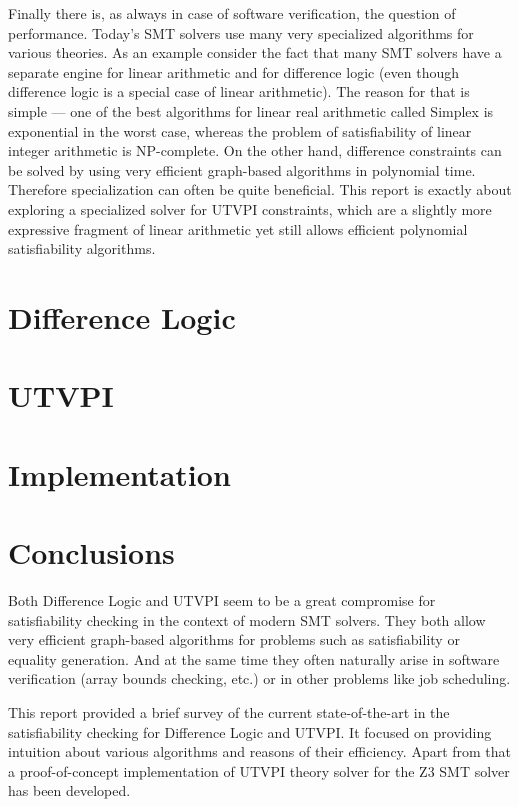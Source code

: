 \documentclass[a4paper,10pt]{article}
\begin{document}
Finally there is, as always in case of software verification, the question of
performance. Today's SMT solvers use many very specialized algorithms for
various theories. As an example consider the fact that many SMT solvers have a
separate engine for linear arithmetic and for difference logic (even though
difference logic is a special case of linear arithmetic). The reason for that is
simple --- one of the best algorithms for linear real arithmetic called Simplex
is exponential in the worst case, whereas the problem of satisfiability of
linear integer arithmetic is NP-complete. On the other hand, difference
constraints can be solved by using very efficient graph-based algorithms in
polynomial time. Therefore specialization can often be quite beneficial. This
report is exactly about exploring a specialized solver for UTVPI constraints,
which are a slightly more expressive fragment of linear arithmetic yet still
allows efficient polynomial satisfiability algorithms.

%
%

\newpage
\section{Difference Logic}



%
%

\newpage
\section{UTVPI}


\newpage
\section{Implementation}


%
%

\newpage
\section{Conclusions}

Both Difference Logic and UTVPI seem to be a great compromise for satisfiability
checking in the context of modern SMT solvers. They both allow very efficient
graph-based algorithms for problems such as satisfiability or equality
generation. And at the same time they often naturally arise in software
verification (array bounds checking, etc.) or in other problems like job
scheduling.

This report provided a brief survey of the current state-of-the-art in the
satisfiability checking for Difference Logic and UTVPI. It focused on providing
intuition about various algorithms and reasons of their efficiency. Apart from
that a proof-of-concept implementation of UTVPI theory solver for the Z3 SMT
solver has been developed.




\end{document}
